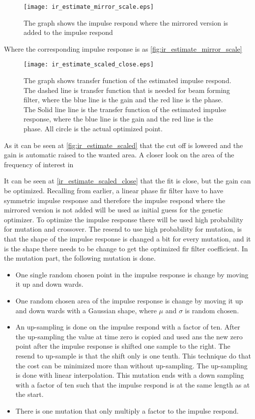\begin{figure}[H]
	\centering
	\texttt{[image: ir\_estimate\_mirror\_scale.eps]}
	\caption{The graph shows the impulse respond where the mirrored version is added to the impulse respond}
		\label{fig:ir_estimate_mirror_scale}
\end{figure}

Where the corresponding impulse response is as \autoref{fig:ir_estimate_mirror_scale}

\begin{figure}[H]
	\centering
	\texttt{[image: ir\_estimate\_scaled\_close.eps]}
	\caption{The graph shows transfer function of the estimated impulse respond. The dashed line is transfer function that is needed for beam forming filter, where the blue line is the gain and the red line is the phase. The Solid line line is the transfer function of the estimated impulse response, where the blue line is the gain and the red line is the phase. All circle is the actual optimized point.}
		\label{fig:ir_estimate_scaled_close}
\end{figure}

As it can be seen at \autoref{fig:ir_estimate_scaled} that the cut off is lowered and the gain is automatic raised to the wanted area. A closer look on the area of the frequency of interest in 

It can be seen at \autoref{ir_estimate_scaled_close} that the fit is close, but the gain can be optimized. Recalling from earlier, a linear phase \gls{fir} filter have to have symmetric impulse response and therefore the impulse respond where the mirrored version is not added will be used as initial guess for the genetic optimizer. To optimize the impulse response there will be used high probability for mutation and crossover. The resend to use high probability for mutation, is that the shape of the impulse response is changed a bit for every mutation, and it is the shape there needs to be change to get the optimized \gls{fir} filter coefficient. In the mutation part, the following mutation is done.

\begin{itemize}
\item One single random chosen point in the impulse response is change by moving it up and down wards.
\item One random chosen area of the impulse response is change by moving it up and down wards with a Gaussian shape, where $\mu$ and $\sigma$ is random chosen.
\item An up-sampling is done on the impulse respond with a factor of ten. After the up-sampling the value at time zero is copied and used ans the new zero point after the impulse response is shifted one sample to the right. The resend to up-sample is that the shift only is one tenth. This technique do that the cost can be minimized more than without up-sampling. The up-sampling is done with linear interpolation. This mutation ends with a down sampling with a factor of ten such that the impulse respond is at the same length as at the start.
\item There is one mutation that only multiply a factor to the impulse respond. 
\end{itemize}

